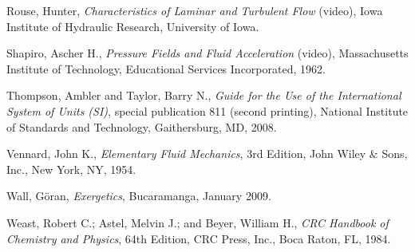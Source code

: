 \vskip 10pt

\noindent
Rouse, Hunter, \textit{Characteristics of Laminar and Turbulent Flow} (video), Iowa Institute of Hydraulic Research, University of Iowa.

\vskip 10pt

\noindent
Shapiro, Ascher H., \textit{Pressure Fields and Fluid Acceleration} (video), Massachusetts Institute of Technology, Educational Services Incorporated, 1962.

\vskip 10pt

\noindent
Thompson, Ambler and Taylor, Barry N., \textit{Guide for the Use of the International System of Units (SI)}, special publication 811 (second printing), National Institute of Standards and Technology, Gaithersburg, MD, 2008.

\vskip 10pt

\noindent
Vennard, John K., \textit{Elementary Fluid Mechanics}, 3rd Edition, John Wiley \& Sons, Inc., New York, NY, 1954.

\vskip 10pt

\noindent
Wall, G\"{o}ran, \textit{Exergetics}, Bucaramanga, January 2009.

\vskip 10pt

\noindent
Weast, Robert C.; Astel, Melvin J.; and Beyer, William H., \textit{CRC Handbook of Chemistry and Physics}, 64th Edition, CRC Press, Inc., Boca Raton, FL, 1984.


















